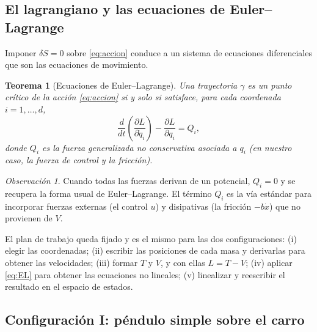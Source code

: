 \documentclass[11pt,letterpaper]{article}
\theoremstyle{definition}
\theoremstyle{plain}
\newtheorem{teorema}[definicion]{Teorema}
\theoremstyle{remark}
\newtheorem{observacion}[definicion]{Observación}
\begin{document}
\subsection{El lagrangiano y las ecuaciones de Euler--Lagrange}
\label{sub:euler}

Imponer $\delta S=0$ sobre \cref{eq:accion} conduce a un sistema de
ecuaciones diferenciales que son las ecuaciones de movimiento.

\begin{teorema}[Ecuaciones de Euler--Lagrange]
\label{thm:EL}
Una trayectoria $\gamma$ es un punto crítico de la acción
\cref{eq:accion} si y solo si satisface, para cada coordenada
$i=1,\dots,d$,
\begin{equation}\label{eq:EL}
  \frac{d}{dt}\!\left(\frac{\partial L}{\partial \dot q_i}\right)
  -\frac{\partial L}{\partial q_i}=Q_i,
\end{equation}
donde $Q_i$ es la fuerza generalizada \emph{no conservativa} asociada a
$q_i$ (en nuestro caso, la fuerza de control y la fricción).
\end{teorema}

\begin{observacion}
Cuando todas las fuerzas derivan de un potencial, $Q_i=0$ y se recupera
la forma usual de Euler--Lagrange. El término $Q_i$ es la vía estándar
para incorporar fuerzas externas (el control $u$) y disipativas (la
fricción $-b\dot x$) que no provienen de $V$.
\end{observacion}

El plan de trabajo queda fijado y es el mismo para las dos
configuraciones: (i) elegir las coordenadas; (ii) escribir las posiciones
de cada masa y derivarlas para obtener las velocidades; (iii) formar $T$
y $V$, y con ellas $L=T-V$; (iv) aplicar \cref{eq:EL} para obtener las
ecuaciones no lineales; (v) linealizar y reescribir el resultado en el
espacio de estados.

\subsection{Configuración I: péndulo simple sobre el carro}
\label{sub:simple}
\end{document}
